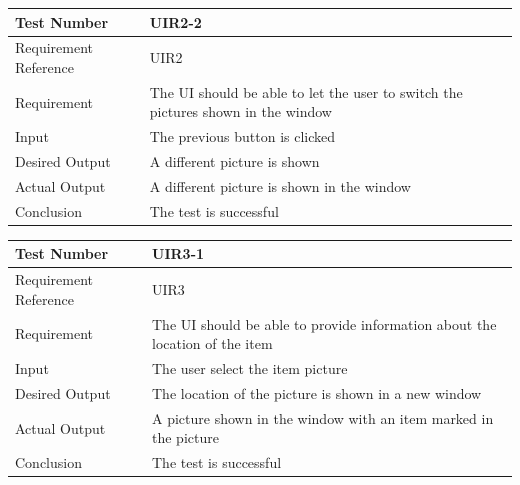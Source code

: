 \documentclass[12pt, titlepage]{article}
\begin{document}
\begin{table}[H]
\begin{center}
\begin{tabular}{|l | m{9cm}|}
\hline
  Test Number & UIR2-2\\
  \hline
  Requirement Reference & UIR2\\
  \hline
  Requirement & The UI should be able to let the user to switch the pictures shown in the window \\
  \hline
  Input & The previous button is clicked\\
  \hline
  Desired Output & A different picture is shown\\
  \hline
  Actual Output & A different picture is shown in the window \\
  \hline
  Conclusion & The test is successful\\
  \hline
\end{tabular}
\end{center}           
\end{table}

\begin{table}[H]
\begin{center}
\begin{tabular}{|l | m{9cm}|}
\hline
  Test Number & UIR3-1\\
  \hline
  Requirement Reference & UIR3\\
  \hline
  Requirement & The UI should be able to provide information about the location of the item \\
  \hline
  Input & The user select the item picture\\
  \hline
  Desired Output & The location of the picture is shown in a new window\\
  \hline
  Actual Output & A picture shown in the window with an item marked in the picture\\
  \hline
  Conclusion & The test is successful\\
  \hline
\end{tabular}
\end{center}           
\end{table}
\end{document}
